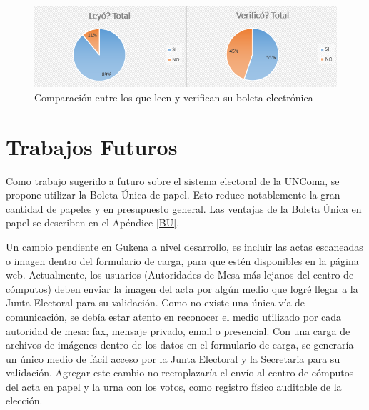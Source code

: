 \begin{figure}[h!]
  \includegraphics[width=\textwidth]{img/graficosEncuesta.png}
  \caption{Comparación entre los que leen y verifican su boleta electrónica}
  \label{graf:graficoEncuesta}
\end{figure}



\section{Trabajos Futuros}

Como trabajo sugerido a futuro  sobre el sistema electoral de la UNComa, se propone utilizar la Boleta Única de papel. Esto reduce notablemente la gran cantidad de papeles y en presupuesto general. Las ventajas de la Boleta Única en papel se describen en el Apéndice \ref{BU}.\newline

Un cambio pendiente en Gukena a nivel desarrollo, es incluir las actas escaneadas o imagen dentro del formulario de carga, para que estén disponibles en la página web. Actualmente, los usuarios (Autoridades de Mesa más lejanos del centro de cómputos) deben enviar la imagen del acta por algún medio que logré llegar a la Junta Electoral para su validación. Como no existe una única vía de comunicación, se debía estar atento en reconocer el medio utilizado por cada autoridad de mesa: fax, mensaje privado, email o presencial. Con una carga de archivos de imágenes dentro de los datos en el formulario de carga, se generaría un único medio de fácil acceso por la Junta Electoral y la Secretaria para su validación.
Agregar este cambio no reemplazaría el envío al centro de cómputos del acta en papel y la urna con los votos, como registro físico auditable de la elección. 
